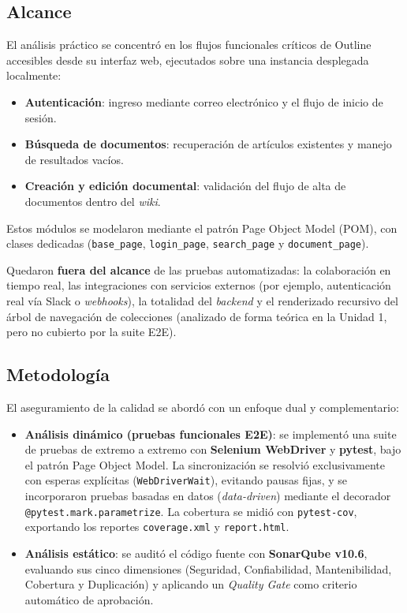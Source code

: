\documentclass[12pt, letterpaper]{article}
\begin{document}
\subsection{Alcance}

El análisis práctico se concentró en los flujos funcionales críticos de Outline accesibles desde su interfaz web, ejecutados sobre una instancia desplegada localmente:

\begin{itemize}
  \item \textbf{Autenticación}: ingreso mediante correo electrónico y el flujo de inicio de sesión.
  \item \textbf{Búsqueda de documentos}: recuperación de artículos existentes y manejo de resultados vacíos.
  \item \textbf{Creación y edición documental}: validación del flujo de alta de documentos dentro del \textit{wiki}.
\end{itemize}

Estos módulos se modelaron mediante el patrón Page Object Model (POM), con clases dedicadas (\texttt{base\_page}, \texttt{login\_page}, \texttt{search\_page} y \texttt{document\_page}).

Quedaron \textbf{fuera del alcance} de las pruebas automatizadas: la colaboración en tiempo real, las integraciones con servicios externos (por ejemplo, autenticación real vía Slack o \textit{webhooks}), la totalidad del \textit{backend} y el renderizado recursivo del árbol de navegación de colecciones (analizado de forma teórica en la Unidad 1, pero no cubierto por la suite E2E).

\subsection{Metodología}

El aseguramiento de la calidad se abordó con un enfoque dual y complementario:

\begin{itemize}
  \item \textbf{Análisis dinámico (pruebas funcionales E2E)}: se implementó una suite de pruebas de extremo a extremo con \textbf{Selenium WebDriver} y \textbf{pytest}, bajo el patrón Page Object Model. La sincronización se resolvió exclusivamente con esperas explícitas (\texttt{WebDriverWait}), evitando pausas fijas, y se incorporaron pruebas basadas en datos (\textit{data-driven}) mediante el decorador \texttt{@pytest.mark.parametrize}. La cobertura se midió con \texttt{pytest-cov}, exportando los reportes \texttt{coverage.xml} y \texttt{report.html}.
  \item \textbf{Análisis estático}: se auditó el código fuente con \textbf{SonarQube v10.6}, evaluando sus cinco dimensiones (Seguridad, Confiabilidad, Mantenibilidad, Cobertura y Duplicación) y aplicando un \textit{Quality Gate} como criterio automático de aprobación.
\end{itemize}
\end{document}
